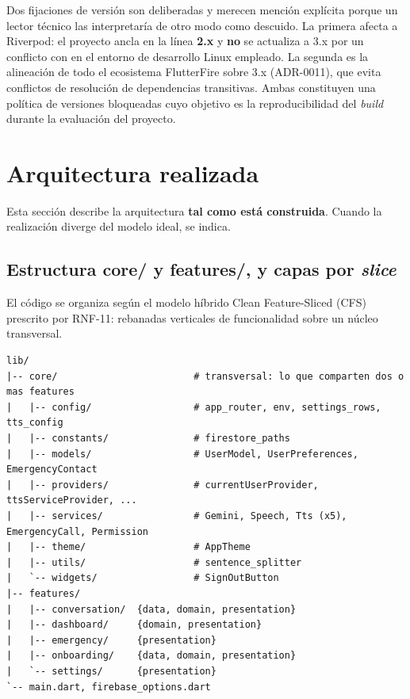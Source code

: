 Dos fijaciones de versión son deliberadas y merecen mención explícita porque un lector técnico las
interpretaría de otro modo como descuido. La primera afecta a Riverpod: el proyecto ancla
 en la línea \textbf{2.x} y \textbf{no} se actualiza a 3.x por un conflicto con
 en el entorno de desarrollo Linux empleado. La segunda es la alineación de todo el
ecosistema FlutterFire sobre
 3.x (ADR-0011), que evita conflictos de resolución de dependencias transitivas. Ambas
constituyen una política de versiones bloqueadas cuyo objetivo es la reproducibilidad del \emph{build}
durante la evaluación del proyecto.

\section{Arquitectura realizada}
\label{sec:arquitectura}

Esta sección describe la arquitectura \textbf{tal como está construida}. Cuando la realización diverge del
modelo ideal, se indica.

\subsection{Estructura core/ y features/, y capas por \emph{slice}}

El código se organiza según el modelo híbrido Clean Feature-Sliced (CFS) prescrito por RNF-11: rebanadas
verticales de funcionalidad sobre un núcleo transversal.

\begin{lstlisting}[style=Consola, caption={Estructura real del árbol de código fuente.}, label={lst:arbol}]
lib/
|-- core/                        # transversal: lo que comparten dos o mas features
|   |-- config/                  # app_router, env, settings_rows, tts_config
|   |-- constants/               # firestore_paths
|   |-- models/                  # UserModel, UserPreferences, EmergencyContact
|   |-- providers/               # currentUserProvider, ttsServiceProvider, ...
|   |-- services/                # Gemini, Speech, Tts (x5), EmergencyCall, Permission
|   |-- theme/                   # AppTheme
|   |-- utils/                   # sentence_splitter
|   `-- widgets/                 # SignOutButton
|-- features/
|   |-- conversation/  {data, domain, presentation}
|   |-- dashboard/     {domain, presentation}
|   |-- emergency/     {presentation}
|   |-- onboarding/    {data, domain, presentation}
|   `-- settings/      {presentation}
`-- main.dart, firebase_options.dart
\end{lstlisting}

